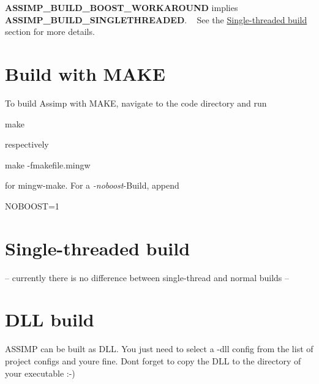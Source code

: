 {\bfseries A\+S\+S\+I\+M\+P\+\_\+\+B\+U\+I\+L\+D\+\_\+\+B\+O\+O\+S\+T\+\_\+\+W\+O\+R\+K\+A\+R\+O\+U\+N\+D} implies {\bfseries A\+S\+S\+I\+M\+P\+\_\+\+B\+U\+I\+L\+D\+\_\+\+S\+I\+N\+G\+L\+E\+T\+H\+R\+E\+A\+D\+E\+D}. ~\newline
 See the \hyperlink{install_assimp_st}{Single-\/threaded build} section for more details.\hypertarget{install_assimp_make}{}\section{Build with M\+A\+K\+E}\label{install_assimp_make}
To build Assimp with M\+A\+K\+E, navigate to the {\ttfamily code} directory and run 
\begin{DoxyCode}
make
\end{DoxyCode}
 respectively 
\begin{DoxyCode}
make -fmakefile.mingw
\end{DoxyCode}
 for mingw-\/make. For a {\itshape -\/noboost}-\/\+Build, append 
\begin{DoxyCode}
NOBOOST=1
\end{DoxyCode}
\hypertarget{install_assimp_st}{}\section{Single-\/threaded build}\label{install_assimp_st}
-- currently there is no difference between single-\/thread and normal builds --\hypertarget{install_assimp_dll}{}\section{D\+L\+L build}\label{install_assimp_dll}
A\+S\+S\+I\+M\+P can be built as D\+L\+L. You just need to select a -\/dll config from the list of project configs and you\textquotesingle{}re fine. Don\textquotesingle{}t forget to copy the D\+L\+L to the directory of your executable \+:-\/)


